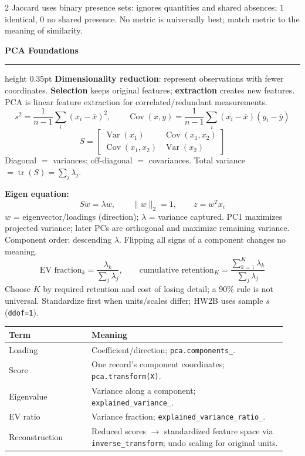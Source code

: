 \documentclass[8pt]{article}
\newcommand{\sect}[1]{\vspace{1pt}\textcolor{accent}{\textbf{\normalsize #1}}\par\vspace{1pt}\hrule height 0.35pt\vspace{0pt}}
\newcommand{\term}[1]{\textbf{#1}}
\newcommand{\code}[1]{\texttt{#1}}
\begin{document}
\begin{multicols*}{2}
Jaccard uses binary presence sets: ignores quantities and shared absences; $1$ identical, $0$ no shared presence. No metric is universally best; match metric to the meaning of similarity.


\sect{PCA Foundations}
\term{Dimensionality reduction}: represent observations with fewer coordinates. \term{Selection} keeps original features; \term{extraction} creates new features. PCA is linear feature extraction for correlated/redundant measurements.
\[
s^2=\frac{1}{n-1}\sum_i(x_i-\bar x)^2,\qquad \operatorname{Cov}(x,y)=\frac{1}{n-1}\sum_i(x_i-\bar x)(y_i-\bar y)
\]
\[
S=\begin{bmatrix}\operatorname{Var}(x_1)&\operatorname{Cov}(x_1,x_2)\\\operatorname{Cov}(x_1,x_2)&\operatorname{Var}(x_2)\end{bmatrix}
\]
Diagonal $=$ variances; off-diagonal $=$ covariances. Total variance $=\operatorname{tr}(S)=\sum_j\lambda_j$.

\term{Eigen equation:}
\[
Sw=\lambda w,\qquad \|w\|_2=1,\qquad z=w^Tx_c
\]
$w$ = eigenvector/loadings (direction); $\lambda$ = variance captured. PC1 maximizes projected variance; later PCs are orthogonal and maximize remaining variance. Component order: descending $\lambda$. Flipping all signs of a component changes no meaning.
\[
\text{EV fraction}_k=\frac{\lambda_k}{\sum_j\lambda_j},\qquad \text{cumulative retention}_K=\frac{\sum_{k=1}^K\lambda_k}{\sum_j\lambda_j}
\]
Choose $K$ by required retention and cost of losing detail; a 90\% rule is not universal. Standardize first when units/scales differ; HW2B uses sample $s$ (\code{ddof=1}).

\begin{tabular}{@{}p{0.28\linewidth}p{0.66\linewidth}@{}}
\toprule
Term & Meaning \\
\midrule
Loading & Coefficient/direction; \code{pca.components\_}.\\
Score & One record's component coordinates; \code{pca.transform(X)}.\\
Eigenvalue & Variance along a component; \code{explained\_variance\_}.\\
EV ratio & Variance fraction; \code{explained\_variance\_ratio\_}.\\
Reconstruction & Reduced scores $\to$ standardized feature space via \code{inverse\_transform}; undo scaling for original units.\\
\bottomrule
\end{tabular}


\end{multicols*}
\end{document}
